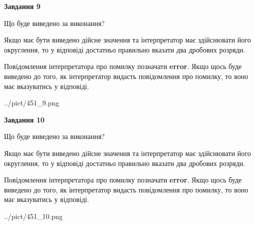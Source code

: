 \documentclass[12pt, ukrainian]{article}
\begin{document}
{\begin {Large}
{\begin {center}\textbf{Завдання 9}\end {center}}\par
Що буде виведено за виконання? \par

Якщо має бути виведено дійсне значення та інтерпретатор має здійснювати його округлення, 
то у відповіді достатньо правильно вказати два дробових розряди.

Повідомлення інтерпретатора про помилку позначати \textbf{error}.
Якщо щось буде виведено до того, як інтерпретатор видасть повідомлення про помилку, 
то воно має вказуватись у відповіді. \par

\begin{center}
	{../pict/451_9.png}
\end{center}
\newpage

{\begin {center}\textbf{Завдання 10}\end {center}}\par
Що буде виведено за виконання? \par

Якщо має бути виведено дійсне значення та інтерпретатор має здійснювати його округлення, 
то у відповіді достатньо правильно вказати два дробових розряди.

Повідомлення інтерпретатора про помилку позначати \textbf{error}.
Якщо щось буде виведено до того, як інтерпретатор видасть повідомлення про помилку, 
то воно має вказуватись у відповіді. \par

\begin{center}
	{../pict/451_10.png}
\end{center}
\newpage

\end {Large}}
\end{document}

